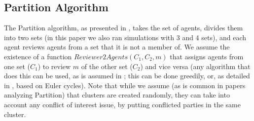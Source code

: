 \documentclass[letterpaper]{article} %
\begin{document}
\subsection{Partition Algorithm}
The Partition algorithm, as presented in \citet{AFPT11}, takes the set of agents, divides them into two sets (in this paper we also ran simulations with 3 and 4 sets), and each agent reviews agents from a set that it is not a member of. %
We assume the existence of a function $Reviewer2Agents(C_{1},C_{2},m)$ that assigns agents from one set ($C_{1}$) to review $m$ of the other set ($C_{2}$) and vice versa (any algorithm that does this can be used, as is assumed in \citet{ALMRW16,ALMRW19}; this can be done greedily, or, as detailed in \citet{LMTZ23}, based on Euler cycles). Note that while we assume (as is common in papers analyzing Partition) that clusters are created randomly, they can take into account any conflict of interest issue, by putting conflicted parties in the same cluster.


%
\end{document}
